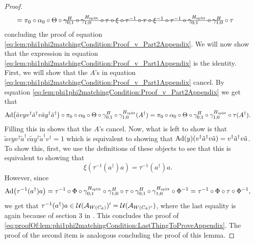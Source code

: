 \documentclass[11pt,a4paper,twoside]{article}
\numberwithin{equation}{section}
\begin{document}
\begin{proof}
\begin{align}
			&=\pi_0\circ\alpha_0\circ\Theta\circ\stkout{\gamma^{H}_{0;1}\circ\gamma^{\Hsplit}_{1;0}\circ\tau\circ\xi\circ\tau^{-1}\circ\tau\circ\xi^{-1}\circ\tau^{-1}\circ\gamma^{\Hsplit}_{0;1}\circ\gamma^H_{1;0}}\circ\tau
		\end{align}
		concluding the proof of equation \eqref{eq:lem:phi1phi2matchingCondition:Proof_v_Part2Appendix}. We will now show that the expression in equation \eqref{eq:lem:phi1phi2matchingCondition:Proof_v_Part1Appendix} is the identity. First, we will show that the $A$'s in equation \eqref{eq:lem:phi1phi2matchingCondition:Proof_v_Part1Appendix} cancel. By equation \eqref{eq:lem:phi1phi2matchingCondition:Proof_v_Part2Appendix} we get that
		\begin{equation}
			\Ad{\tilde{a}vyv^\dagger\tilde{a}^\dagger v\tilde{a}y^\dagger\tilde{a}^\dagger}\circ\pi_0\circ\alpha_0\circ\Theta\circ\gamma^{H}_{0;1}\circ\gamma^{\Hsplit}_{1;0}(A^\dagger)=\pi_0\circ\alpha_0\circ\Theta\circ\gamma^{H}_{0;1}\circ\gamma^{\Hsplit}_{1;0}\circ\tau(A^\dagger).
		\end{equation}
		Filling this in shows that the $A$'s cancel. Now, what is left to show is that $\tilde{a}vyv^\dagger\tilde{a}^\dagger v \tilde{a}y^\dagger\tilde{a}^\dagger  v^\dagger=1$ which is equivalent to showing that $\Ad{y}(v^\dagger \tilde{a}^\dagger v \tilde{a})=v^\dagger \tilde{a}^\dagger v \tilde{a}$. To show this, first, we use the definitions of these objects to see that this is equivalent to showing that
		\begin{equation}\label{eq:proofOf:lem:phi1phi2matchingCondition:LastThingToProveAppendix}
			\xi(\tau^{-1}(a^\dagger)a)=\tau^{-1}(a^\dagger)a.
		\end{equation}
		However, since
		\begin{equation}
			\Ad{\tau^{-1}(a^\dagger)a}=\tau^{-1}\circ\Phi\circ\gamma^{\Hsplit}_{0;1}\circ\gamma^H_{1;0}\circ\tau\circ\gamma^H_{0;1}\circ\gamma^{\Hsplit}_{1;0}\circ\Phi^{-1}=\tau^{-1}\circ\Phi\circ\tau\circ\Phi^{-1},
		\end{equation}
		we get that $\tau^{-1}(a^\dagger)a\in\mathcal U(\mathcal A_{W(C_\theta)})'=\mathcal U(\mathcal A_{W(C_\theta)^c})$, where the last equality is again because of section 3 in \cite{NaScWe_2013}. This concludes the proof of \ref{eq:proofOf:lem:phi1phi2matchingCondition:LastThingToProveAppendix}. The proof of the second item is analogous concluding the proof of this lemma.
	\end{proof}
\end{document}
